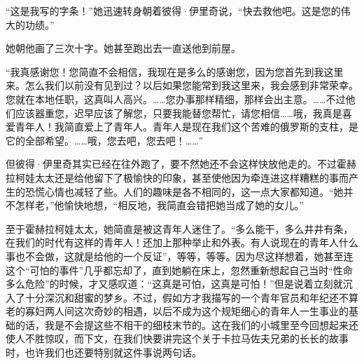\par “这是我写的字条！”她迅速转身朝着彼得·伊里奇说，“快去救他吧。这是您的伟大的功绩。”
\par 她朝他画了三次十字。她甚至跑出去一直送他到前屋。
\par “我真感谢您！您简直不会相信，我现在是多么的感谢您，因为您首先到我这里来。怎么我们以前没有见到过？以后如果您能常到我这里来，我会感到非常荣幸。您就在本地任职，这真叫人高兴。……您办事那样精细，那样会出主意。……不过他们应该器重您，迟早应该了解您，只要我能替您帮忙，请您相信……哦，我真是喜爱青年人！我简直爱上了青年人。青年人是现在我们这个苦难的俄罗斯的支柱，是它的全部希望。……哦，您去吧，您去吧！……”
\par 但彼得·伊里奇其实已经在往外跑了，要不然她还不会这样快放他走的。不过霍赫拉柯娃太太还是给他留下了极愉快的印象，甚至使他因为牵连进这样糟糕的事而产生的恐慌心情也减轻了些。人们的趣味是各不相同的，这一点大家都知道。“她并不怎样老，”他愉快地想，“相反地，我简直会错把她当成了她的女儿。”
\par 至于霍赫拉柯娃太太，她简直是被这青年人迷住了。“多么能干，多么井井有条，在我们的时代有这样的青年人！还加上那种举止和外表。有人说现在的青年人什么事也不会做，这就是给他的一个反证”，等等，等等。因为尽这样想着，她甚至连这个“可怕的事件”几乎都忘却了，直到她躺在床上，忽然重新想起自己当时“性命多么危险”的时候，才又感叹道：“这真是可怕，这真是可怕！”但是说着立刻就沉入了十分深沉和甜蜜的梦乡。不过，假如方才我描写的一个青年官员和年纪还不算老的寡妇两人间这次奇妙的相遇，以后不成为这个规矩细心的青年人一生事业的基础的话，我是不会提这些不相干的细枝末节的。这在我们的小城里至今回想起来还使人不胜惊叹，而下文，在我们快要讲完这个关于卡拉马佐夫兄弟的长长的故事时，也许我们也还要特别就这件事说两句话。
